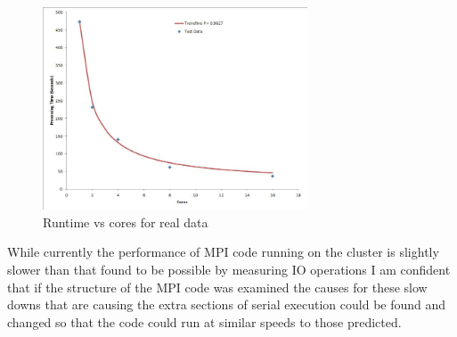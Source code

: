 \begin{figure}[ht]
	\begin{center}
		\includegraphics[width=0.7\textwidth]{Capture}
	\end{center}
	\caption{Runtime vs cores for real data}
	\label{real_data}
\end{figure}

While currently the performance of MPI code running on the cluster is slightly slower than that found to be possible by measuring IO operations I am confident that if the structure of the MPI code was examined the causes for these slow downs that are causing the extra sections of serial execution could be found and changed so that the code could run at similar speeds to those predicted.

